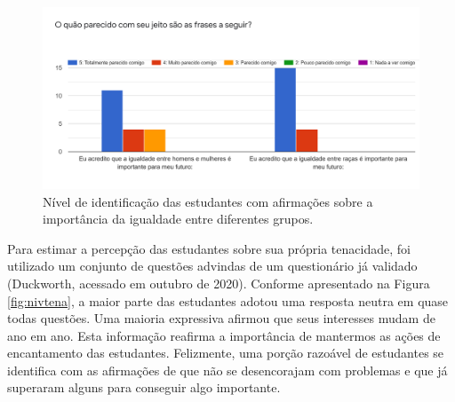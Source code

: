 \documentclass[
]{book}
\begin{document}
\begin{figure}

{\centering \includegraphics[width=1\linewidth,height=0.8\textheight]{images/image45} 

}

\caption{Nível de identificação das estudantes com afirmações sobre a importância da igualdade entre diferentes grupos.}\label{fig:nivgrupos}
\end{figure}

Para estimar a percepção das estudantes sobre sua própria tenacidade, foi utilizado um conjunto de questões advindas de um questionário já validado (Duckworth, acessado em outubro de 2020). Conforme apresentado na Figura \ref{fig:nivtena}, a maior parte das estudantes adotou uma resposta neutra em quase todas questões. Uma maioria expressiva afirmou que seus interesses mudam de ano em ano. Esta informação reafirma a importância de mantermos as ações de encantamento das estudantes. Felizmente, uma porção razoável de estudantes se identifica com as afirmações de que não se desencorajam com problemas e que já superaram alguns para conseguir algo importante.
\end{document}

